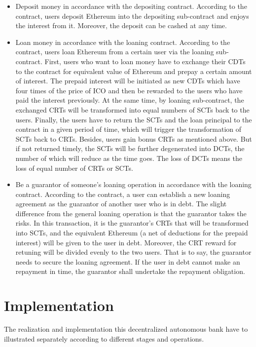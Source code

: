 \documentclass[a4paper, 10pt, conference]{ieeeconf} %
\begin{document}
\begin{itemize} 
   \item Deposit money in accordance with the depositing contract. According to the contract, users deposit Ethereum into the depositing sub-contract and enjoys the interest from it. Moreover, the deposit can be cashed at any time.
   \item Loan money in accordance with the loaning contract. According to the contract, users loan Ethereum from a certain user via the loaning sub-contract. First, users who want to loan money have to exchange their CDTs to the contract for equivalent value of Ethereum and prepay a certain amount of interest. The prepaid interest will be initiated as new CDTs which have four times of the price of ICO and then be rewarded to the users who have paid the interest previously. At the same time, by loaning sub-contract, the exchanged CRTs will be transformed into equal numbers of SCTs back to the users. Finally, the users have to return the SCTs and the loan principal to the contract in a given period of time, which will trigger the  transformation of SCTs back to CRTs. Besides, users gain bonus CRTs as mentioned above. But if not returned timely,  the SCTs will be further degenerated into DCTs, the number of which will reduce as the time goes. The loss of DCTs means the loss of equal number of CRTs or SCTs.
   \item Be a guarantor of someone's loaning operation in accordance with the loaning contract. According to the contract, a user can establish a new loaning agreement as the guarantor of another user who is in debt. The slight difference from the general loaning operation is that the guarantor takes the risks. In this transaction, it is the guarantor's CRTs that will be transformed into SCTs, and the equivalent Ethereum (a net of deductions for the prepaid interest) will be given to the user in debt. Moreover, the CRT reward for retuning will be divided evenly to the two users. That is to say, the guarantor needs to secure the loaning agreement. If the user in debt cannot make an repayment in time, the guarantor shall undertake the repayment obligation.
\end{itemize}

\section{Implementation}
The realization and implementation this decentralized autonomous bank have to illustrated separately according to different stages and operations.
\end{document}
